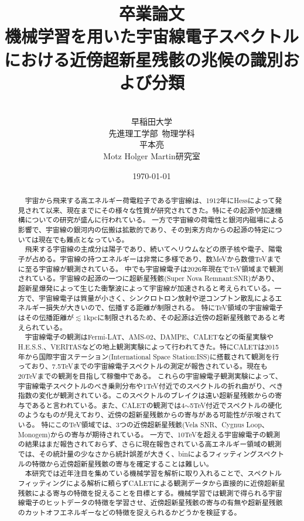 \documentclass[a4paper,11truept]{ltjsreport}
\title{\large{卒業論文}\\ \vspace{2\baselineskip}\huge{機械学習を用いた宇宙線電子スペクトルにおける近傍超新星残骸の兆候の識別および分類}}
\author{\\早稲田大学\\
先進理工学部\ 物理学科\\
平本亮\\
Motz Holger Martin研究室}
\date{\today}
\begin{document}
\maketitle
\clearpage


\begin{abstract}
\thispagestyle{plain} %
　宇宙から飛来する高エネルギー荷電粒子である宇宙線は、1912年にHess\cite{Hess1912}によって発見されて以来、現在までにその様々な性質が研究されてきた。特にその起源や加速機構についての研究が盛んに行われている。
一方で宇宙線の荷電性と銀河内磁場による影響で、宇宙線の銀河内の伝搬は拡散的であり、その到来方向からの起源の特定については現在でも難点となっている。\\
　飛来する宇宙線の主成分は陽子であり、続いてヘリウムなどの原子核や電子、陽電子が占める。宇宙線の持つエネルギーは非常に多様であり、数MeVから数億TeVまでに至る宇宙線が観測されている。
中でも宇宙線電子は2026年現在でTeV領域まで観測されている。宇宙線の起源の一つに超新星残骸(Super Nova Remnant:SNR)があり、超新星爆発によって生じた衝撃波によって宇宙線が加速されると考えられている。一方で、宇宙線電子は質量が小さく、シンクロトロン放射や逆コンプトン散乱によるエネルギー損失が大きいので、伝播する距離が制限される。
特にTeV領域の宇宙線電子はその伝播距離が$\lesssim$1kpcに制限されるため、その起源は近傍の超新星残骸であると考えられている\cite{Kobayashi_2004}。\\
　宇宙線電子の観測はFermi-LAT、AMS-02、DAMPE、CALETなどの衛星実験やH.E.S.S.、VERITASなどの地上観測実験によって行われてきた。特にCALETは2015年から国際宇宙ステーション(International Space Station:ISS)に搭載されて観測を行っており、7.5TeVまでの宇宙線電子スペクトルの測定が報告されている\cite{PhysRevLett.131.191001}。現在も20TeVまでの観測を目指して稼働中である。
これらの宇宙線電子観測実験によって、宇宙線電子スペクトルのべき乗則分布や1TeV付近でのスペクトルの折れ曲がり、べき指数の変化が観測されている\cite{PhysRevLett.131.191001}。このスペクトルのブレイクは遠い超新星残骸からの寄与であると言われている。また、CALETの観測では4$\sim$5TeV付近でスペクトルの硬化のようなものが見えており、近傍の超新星残骸からの寄与がある可能性が示唆されている。
特にこのTeV領域では、3つの近傍超新星残骸(Vela SNR、Cygnus Loop、Monogem)からの寄与が期待されている。
一方で、10TeVを超える宇宙線電子の観測の結果はまだ報告されておらず、さらに現在報告されている高エネルギー領域の観測では、その統計量の少なさから統計誤差が大きく、binによるフィッティングスペクトルの特徴から近傍超新星残骸の寄与を確定することは難しい。\\
　本研究では近年注目を集めている機械学習を解析に取り入れることで、スペクトルフィッティングによる解析に頼らずCALETによる観測データから直接的に近傍超新星残骸による寄与の特徴を捉えることを目標とする。機械学習では観測で得られる宇宙線電子のヒットデータの特徴を学習させ、近傍超新星残骸の寄与の有無や超新星残骸のカットオフエネルギーなどの特徴を捉えられるかどうかを検証する。

\end{abstract}
\end{document}
